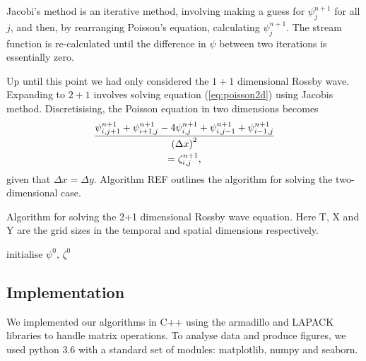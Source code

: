 Jacobi's method is an iterative method, involving making a guess for $\psi^{n+1}_j$ for all $j$, and then, by rearranging Poisson's equation, calculating $\psi_j^{n+1}$. The stream function is re-calculated until the difference in $\psi$ between two iterations is essentially zero.       

Up until this point we had only considered the $1 + 1$ dimensional Rossby wave. Expanding to $2 + 1$ involves solving equation (\ref{eq:poisson2d}) using Jacobis method. Discretisising, the Poisson equation in two dimensions becomes
	\begin{multline}
	\label{eq:poissondiscret}
	\frac{\psi^{n+1}_{i,j+1} + \psi^{n+1}_{i+1,j} - 4\psi^{n+1}_{i,j} + \psi^{n+1}_{i,j-1}+ \psi^{n+1}_{i-1,j}}{\qty(\Delta x)^2} \\= \zeta^{n+1}_{i,j},
	\end{multline}
given that $\Delta x = \Delta y$. Algorithm REF outlines the algorithm for solving the two-dimensional case.

\begin{algorithm}[htbp]
	\caption{Algorithm for solving the 2+1 dimensional Rossby wave equation. Here T, X and Y are the grid sizes in the temporal and spatial dimensions respectively.}
	\SetAlgoLined
	\BlankLine
	\BlankLine
	initialise $\psi^0,\, \zeta^0$\;
	\BlankLine
	\BlankLine
	\label{algo:2drossby}
\end{algorithm} 

\subsection{Implementation}
\label{sec:implement}
We implemented our algorithms in C++ using the armadillo and LAPACK libraries to handle matrix operations. To analyse data and produce figures, we used python 3.6 with a standard set of modules: matplotlib, numpy and seaborn.

